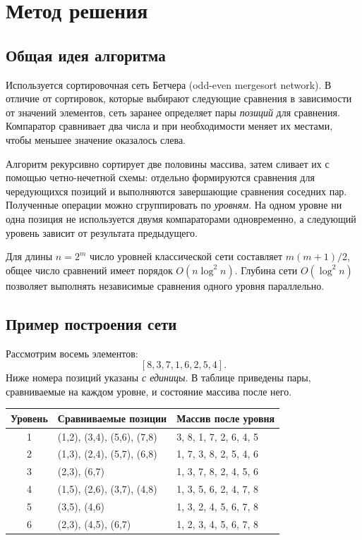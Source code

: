 \documentclass[12pt,a4paper,oneside]{article}
\begin{document}
\section{Метод решения}
\subsection{Общая идея алгоритма}
Используется сортировочная сеть Бетчера (odd-even mergesort network). В отличие от сортировок, которые выбирают следующие сравнения в зависимости от значений элементов, сеть заранее определяет пары \emph{позиций} для сравнения. Компаратор сравнивает два числа и при необходимости меняет их местами, чтобы меньшее значение оказалось слева.

Алгоритм рекурсивно сортирует две половины массива, затем сливает их с помощью четно-нечетной схемы: отдельно формируются сравнения для чередующихся позиций и выполняются завершающие сравнения соседних пар. Полученные операции можно сгруппировать по \emph{уровням}. На одном уровне ни одна позиция не используется двумя компараторами одновременно, а следующий уровень зависит от результата предыдущего.

Для длины $n=2^m$ число уровней классической сети составляет $m(m+1)/2$, общее число сравнений имеет порядок $O(n\log^2 n)$. Глубина сети $O(\log^2 n)$ позволяет выполнять независимые сравнения одного уровня параллельно.

\subsection{Пример построения сети}
Рассмотрим восемь элементов:
\[
[8,3,7,1,6,2,5,4].
\]
Ниже номера позиций указаны \emph{с единицы}. В таблице приведены пары, сравниваемые на каждом уровне, и состояние массива после него.

\begin{center}\small
\begin{tabular}{|c|p{6.3cm}|p{5.0cm}|}
\hline
Уровень & Сравниваемые позиции & Массив после уровня \\ \hline
1 & (1,2), (3,4), (5,6), (7,8) & 3, 8, 1, 7, 2, 6, 4, 5 \\ \hline
2 & (1,3), (2,4), (5,7), (6,8) & 1, 7, 3, 8, 2, 5, 4, 6 \\ \hline
3 & (2,3), (6,7) & 1, 3, 7, 8, 2, 4, 5, 6 \\ \hline
4 & (1,5), (2,6), (3,7), (4,8) & 1, 3, 5, 6, 2, 4, 7, 8 \\ \hline
5 & (3,5), (4,6) & 1, 3, 2, 4, 5, 6, 7, 8 \\ \hline
6 & (2,3), (4,5), (6,7) & 1, 2, 3, 4, 5, 6, 7, 8 \\ \hline
\end{tabular}
\end{center}
\end{document}
